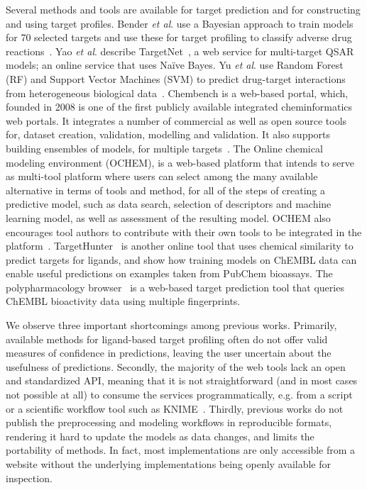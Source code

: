 \documentclass[utf8]{frontiersSCNS} %
\begin{document}
Several methods and tools are available for target prediction and for
constructing and using target profiles.
%
Bender \textit{et al}. use a Bayesian approach to train models for 70 selected targets
and use these for target profiling to classify adverse drug
reactions~\cite{Bender:2007ib}.
%
Yao \textit{et al}. describe TargetNet~\cite{Yao:2016ij}, a web service for
multi-target QSAR models; an online service that uses Na\"ive Bayes.
%
Yu \textit{et al}. use Random Forest (RF) and Support Vector Machines (SVM) to predict
drug-target interactions from heterogeneous biological data~\cite{Yu:2012ol}.
%
Chembench is a web-based portal, which, founded in 2008 is one of the first
publicly available integrated cheminformatics web portals. It integrates a
number of commercial as well as open source tools for, dataset creation,
validation, modelling and validation. It also supports building ensembles of
models, for multiple targets~\cite{Walker2010,Capuzzi2017}.
%
The Online chemical modeling environment (OCHEM), is a web-based platform
that intends to serve as multi-tool platform where users can select among the
many available alternative in terms of tools and method, for all of the steps
of creating a predictive model, such as data search, selection of descriptors
and machine learning model, as well as assessment of the resulting
model. OCHEM also encourages tool authors to contribute with their own tools
to be integrated in the platform~\cite{Sushko2011}.
%
TargetHunter~\cite{Wang:2013le} is another online tool that uses chemical
similarity to predict targets for ligands, and show how training models on
ChEMBL data can enable useful predictions on examples taken from PubChem
bioassays.
%
The polypharmacology browser~\cite{Awale:2017is} is a web-based target
prediction tool that queries ChEMBL bioactivity data using multiple
fingerprints.

We observe three important shortcomings among previous works. Primarily, available
methods for ligand-based target profiling often do not offer valid measures of
confidence in predictions, leaving the user uncertain about the usefulness of
predictions. Secondly, the majority of the web tools lack an open and
standardized API, meaning that it is not straightforward (and in most cases not
possible at all) to consume the services programmatically, e.g. from a
script or a scientific workflow tool such as KNIME~\cite{Mazanetz:2012gy}.
Thirdly, previous works do not publish the preprocessing and modeling
workflows in reproducible formats, rendering it hard to update the models as
data changes, and limits the portability of methods. In fact, most
implementations are only accessible from a website without the underlying
implementations being openly available for inspection.
\end{document}

